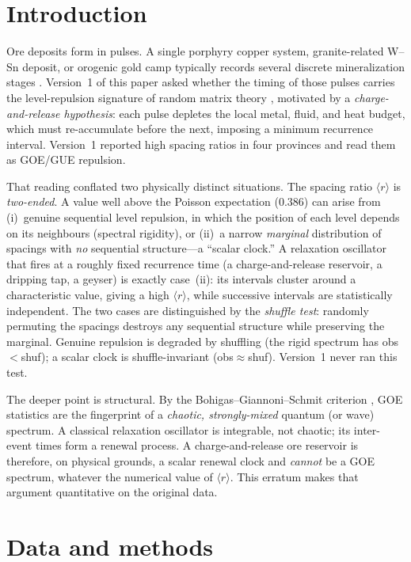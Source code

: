 \documentclass[12pt,a4paper]{article}
\newcommand{\rbar}{\langle r\rangle}
\begin{document}
\section{Introduction}

Ore deposits form in pulses. A single porphyry copper system, granite-related
W--Sn deposit, or orogenic gold camp typically records several discrete
mineralization stages \citep{sillitoe2010,chelle2017}. Version~1 of this paper
asked whether the timing of those pulses carries the level-repulsion signature of
random matrix theory \citep{wigner1957,mehta2004}, motivated by a
\emph{charge-and-release hypothesis}: each pulse depletes the local metal, fluid,
and heat budget, which must re-accumulate before the next, imposing a minimum
recurrence interval. Version~1 reported high spacing ratios in four provinces and
read them as GOE/GUE repulsion.

That reading conflated two physically distinct situations. The spacing ratio
$\rbar$ \citep{oganesyan2007,atas2013} is \emph{two-ended}. A value well above the
Poisson expectation ($0.386$) can arise from (i)~genuine sequential level
repulsion, in which the position of each level depends on its neighbours
(spectral rigidity), or (ii)~a narrow \emph{marginal} distribution of spacings
with \emph{no} sequential structure---a ``scalar clock.'' A relaxation oscillator
that fires at a roughly fixed recurrence time (a charge-and-release reservoir, a
dripping tap, a geyser) is exactly case~(ii): its intervals cluster around a
characteristic value, giving a high $\rbar$, while successive intervals are
statistically independent. The two cases are distinguished by the \emph{shuffle
test}: randomly permuting the spacings destroys any sequential structure while
preserving the marginal. Genuine repulsion is degraded by shuffling (the rigid
spectrum has obs$<$shuf); a scalar clock is shuffle-invariant (obs$\approx$shuf).
Version~1 never ran this test.

The deeper point is structural. By the Bohigas--Giannoni--Schmit criterion
\citep{bgs1984}, GOE statistics are the fingerprint of a \emph{chaotic,
strongly-mixed} quantum (or wave) spectrum. A classical relaxation oscillator is
integrable, not chaotic; its inter-event times form a renewal process. A
charge-and-release ore reservoir is therefore, on physical grounds, a scalar
renewal clock and \emph{cannot} be a GOE spectrum, whatever the numerical value of
$\rbar$. This erratum makes that argument quantitative on the original data.

\section{Data and methods}
\end{document}
